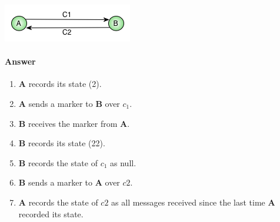 \documentclass{article}
\newcommand{\answer}{\paragraph{Answer}}
\begin{document}
\begin{center}
\includegraphics{images/T3-4.jpg}
\end{center}

\answer
\begin{enumerate}
    \item{\textbf{A} records its state (2).}
    \item{\textbf{A} sends a marker to \textbf{B} over $ c_1 $.}
    \item{\textbf{B} receives the marker from \textbf{A}.}
    \item{\textbf{B} records its state (22).}
    \item{\textbf{B} records the state of $ c_1 $ as null.}
    \item{\textbf{B} sends a marker to \textbf{A} over $ c2 $.}
    \item{\textbf{A} records the state of $ c2 $ as all messages received since the last time \textbf{A} recorded its state.}
\end{enumerate}
\end{document}
